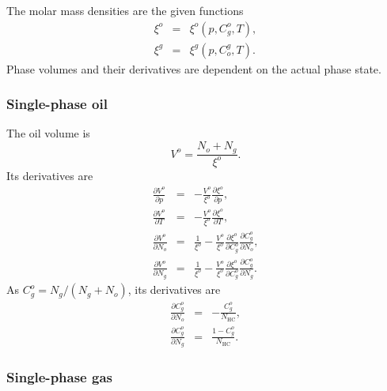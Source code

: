 
The molar mass densities are the given functions
\begin{eqnarray}
  \xi^o & = & \xi^o\left(p,C_g^o,T\right), \\
  \xi^g & = & \xi^g\left(p,C_o^g,T\right).
\end{eqnarray}
Phase volumes and their derivatives are dependent on the actual phase
state.


\subsubsection{Single-phase oil}

The oil volume is
\begin{equation}
  V^o = \frac{N_o + N_g}{\xi^o}.
\end{equation}
Its derivatives are
\begin{eqnarray}
  \frac{\partial V^o}{\partial p} & = &
  -\frac{V^o}{\xi^o} \frac{\partial \xi^o}{\partial p}, \\
  \frac{\partial V^o}{\partial T} & = &
  -\frac{V^o}{\xi^o} \frac{\partial \xi^o}{\partial T}, \\
  \frac{\partial V^o}{\partial N_o} & = &
  \frac{1}{\xi^o} -
  \frac{V^o}{\xi^o} \frac{\partial \xi^o}{\partial C_g^o}
  \frac{\partial C_g^o}{\partial N_o}, \\
  \frac{\partial V^o}{\partial N_g} & = &
  \frac{1}{\xi^o} -
  \frac{V^o}{\xi^o} \frac{\partial \xi^o}{\partial C_g^o}
  \frac{\partial C_g^o}{\partial N_g}.
\end{eqnarray}
As $C_g^o=N_g/(N_g+N_o)$, its derivatives are
\begin{eqnarray}
  \frac{\partial C_g^o}{\partial N_o} & = &
  -\frac{C_g^o}{N_\text{HC}}, \\
  \frac{\partial C_g^o}{\partial N_g} & = &
  \frac{1-C_g^o}{N_\text{HC}}.
\end{eqnarray}


\subsubsection{Single-phase gas}

